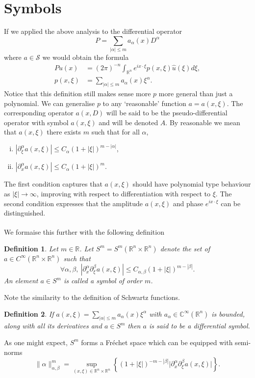 \documentclass[10pt]{article}
\newcommand{\R}{\mathbb{R}}
\newcommand{\C}{\mathbb{C}}
\newtheorem{defn}{Definition}
\begin{document}
\section{Symbols}
If we applied the above analysis to the differential operator
\[
P = \sum_{|\alpha| \le m} a_\alpha(x) D^{\alpha}
\]
where $a \in \mathcal{S}$ we would obtain the formula
\begin{align*}
Pu(x) & = (2 \pi)^{-n} \int_{\R^n} e^{ix \cdot \xi} p(x,\xi) \hat{u}(\xi) d\xi, \\
p(x,\xi) & = \sum_{|\alpha| \le m} a_\alpha(x) \xi^\alpha.
\end{align*}
Notice that this definition still makes sense more $p$ more general than just a polynomial.
We can generalise $p$ to any `reasonable' function $a = a(x,\xi)$.
The corresponding operator $a(x,D)$ will be said to be the pseudo-differential operator with symbol $a(x,\xi)$ and will be denoted $A$.
By reasonable we mean that $a(x,\xi)$ there exists $m$ such that for all $\alpha$,
\begin{enumerate}[(i)]
\item
$\displaystyle |\partial_\xi^\alpha a(x,\xi)| \le C_\alpha (1 + |\xi|)^{m-|\alpha|}$,
\item
$\displaystyle |\partial_x^\alpha a(x,\xi)| \le C_\alpha (1 + |\xi|)^m$.
\end{enumerate}
The first condition captures that $a(x,\xi)$ should have polynomial type behaviour as $|\xi| \to \infty$, improving with respect to differentiation with respect to $\xi$.
The second condition expresses that the amplitude $a(x,\xi)$ and phase $e^{i x \cdot \xi}$ can be distinguished.
\paragraph{}
We formaise this further with the following definition
\begin{defn}
Let $m \in \R$. Let $S^m = S^m(\R^n \times \R^n)$ denote the set of $a \in C^\infty(\R^n \times \R^n)$ such that
\[
\forall \alpha, \beta, \ |\partial_x^\alpha \partial_\xi^\beta a(x,\xi)| \le C_{\alpha,\beta} (1 + |\xi|)^{m-|\beta|}.
\]
An element $a \in S^m$ is called a symbol of order $m$.
\end{defn}
Note the similarity to the definition of Schwartz functions.
\begin{defn}
If $a(x,\xi) = \sum_{|\alpha| \le m} a_\alpha(x) \xi^\alpha$ with $a_\alpha \in \C^\infty(\R^n)$ is bounded, along with all its derivatives
and $a \in S^m$ then $a$ is said to be a differential symbol.
\end{defn}
As one might expect, $S^m$ forms a Fr\'echet space which can be equipped with semi-norms
\[
\lVert \alpha \rVert_{\alpha, \beta}^m = \sup_{(x,\xi) \in \R^n \times \R^n} \left\{(1 + |\xi|)^{-m - |\beta|} \big| \partial_x^\alpha \partial_\xi^\beta a(x,\xi)\big| \right\}.
\]
\end{document}

